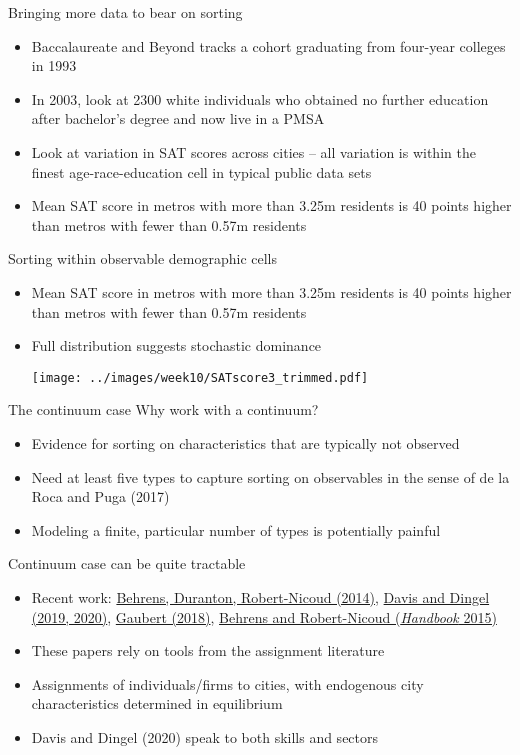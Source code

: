 \documentclass[10pt,notes=hide]{beamer}
\begin{document}
\begin{frame}{Bringing more data to bear on sorting}
\begin{itemize}
	\item Baccalaureate and Beyond tracks a cohort graduating from four-year colleges in 1993 
	\item In 2003, look at 2300 white individuals who obtained no further education after bachelor's degree and now live in a PMSA
	\item Look at variation in SAT scores across cities -- all variation is within the finest age-race-education cell in typical public data sets
	\item Mean SAT score in metros with more than 3.25m residents is 40 points higher than metros with fewer than 0.57m residents
\end{itemize}
\end{frame}
\begin{frame}{Sorting within observable demographic cells}
\begin{itemize}
	\item Mean SAT score in metros with more than 3.25m residents is 40 points higher than metros with fewer than 0.57m residents
	\item Full distribution suggests stochastic dominance
	\begin{center}\texttt{[image: ../images/week10/SATscore3\_trimmed.pdf]}\end{center}
\end{itemize}
\end{frame}
\begin{frame}{The continuum case}
Why work with a continuum?
\begin{itemize}
	\item Evidence for sorting on characteristics that are typically not observed
	\item Need at least five types to capture sorting on observables in the sense of de la Roca and Puga (2017)
	\item Modeling a finite, particular number of types is potentially painful
\end{itemize}
Continuum case can be quite tractable
\begin{itemize}
	\item Recent work: \href{https://ideas.repec.org/a/ucp/jpolec/doi10.1086-675534.html}{Behrens, Duranton, Robert-Nicoud (2014)}, \href{http://faculty.chicagobooth.edu/jonathan.dingel/}{Davis and Dingel (2019, 2020)}, \href{https://www.aeaweb.org/articles?id=10.1257/aer.20150361}{Gaubert (2018)}, \href{http://www.sciencedirect.com/science/article/pii/B9780444595171000040}{Behrens and Robert-Nicoud (\emph{Handbook} 2015)}
	\item These papers rely on tools from the assignment literature
	\item Assignments of individuals/firms to cities, with endogenous city characteristics determined in equilibrium
	\item Davis and Dingel (2020) speak to both skills and sectors
\end{itemize}
\end{frame}
\end{document}
